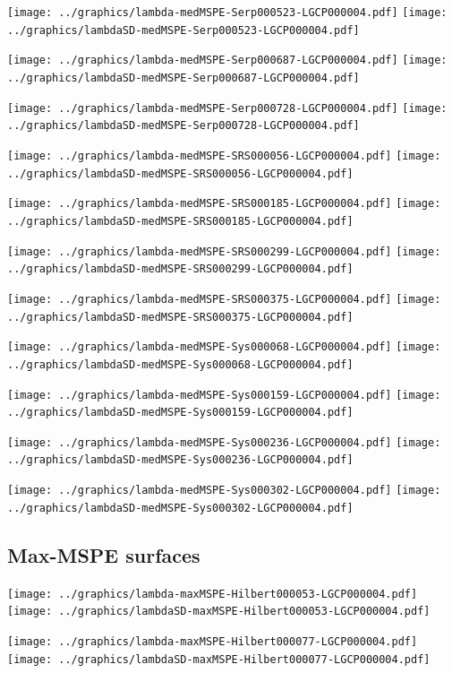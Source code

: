 \documentclass[review]{elsarticle}
\begin{document}
\texttt{[image: ../graphics/lambda-medMSPE-Serp000523-LGCP000004.pdf]}
\texttt{[image: ../graphics/lambdaSD-medMSPE-Serp000523-LGCP000004.pdf]}

\texttt{[image: ../graphics/lambda-medMSPE-Serp000687-LGCP000004.pdf]}
\texttt{[image: ../graphics/lambdaSD-medMSPE-Serp000687-LGCP000004.pdf]}

\texttt{[image: ../graphics/lambda-medMSPE-Serp000728-LGCP000004.pdf]}
\texttt{[image: ../graphics/lambdaSD-medMSPE-Serp000728-LGCP000004.pdf]}

\texttt{[image: ../graphics/lambda-medMSPE-SRS000056-LGCP000004.pdf]}
\texttt{[image: ../graphics/lambdaSD-medMSPE-SRS000056-LGCP000004.pdf]}

\texttt{[image: ../graphics/lambda-medMSPE-SRS000185-LGCP000004.pdf]}
\texttt{[image: ../graphics/lambdaSD-medMSPE-SRS000185-LGCP000004.pdf]}

\texttt{[image: ../graphics/lambda-medMSPE-SRS000299-LGCP000004.pdf]}
\texttt{[image: ../graphics/lambdaSD-medMSPE-SRS000299-LGCP000004.pdf]}

\texttt{[image: ../graphics/lambda-medMSPE-SRS000375-LGCP000004.pdf]}
\texttt{[image: ../graphics/lambdaSD-medMSPE-SRS000375-LGCP000004.pdf]}

\texttt{[image: ../graphics/lambda-medMSPE-Sys000068-LGCP000004.pdf]}
\texttt{[image: ../graphics/lambdaSD-medMSPE-Sys000068-LGCP000004.pdf]}

\texttt{[image: ../graphics/lambda-medMSPE-Sys000159-LGCP000004.pdf]}
\texttt{[image: ../graphics/lambdaSD-medMSPE-Sys000159-LGCP000004.pdf]}

\texttt{[image: ../graphics/lambda-medMSPE-Sys000236-LGCP000004.pdf]}
\texttt{[image: ../graphics/lambdaSD-medMSPE-Sys000236-LGCP000004.pdf]}

\texttt{[image: ../graphics/lambda-medMSPE-Sys000302-LGCP000004.pdf]}
\texttt{[image: ../graphics/lambdaSD-medMSPE-Sys000302-LGCP000004.pdf]}

\subsection{Max-MSPE surfaces}

\texttt{[image: ../graphics/lambda-maxMSPE-Hilbert000053-LGCP000004.pdf]}
\texttt{[image: ../graphics/lambdaSD-maxMSPE-Hilbert000053-LGCP000004.pdf]}

\texttt{[image: ../graphics/lambda-maxMSPE-Hilbert000077-LGCP000004.pdf]}
\texttt{[image: ../graphics/lambdaSD-maxMSPE-Hilbert000077-LGCP000004.pdf]}
\end{document}
